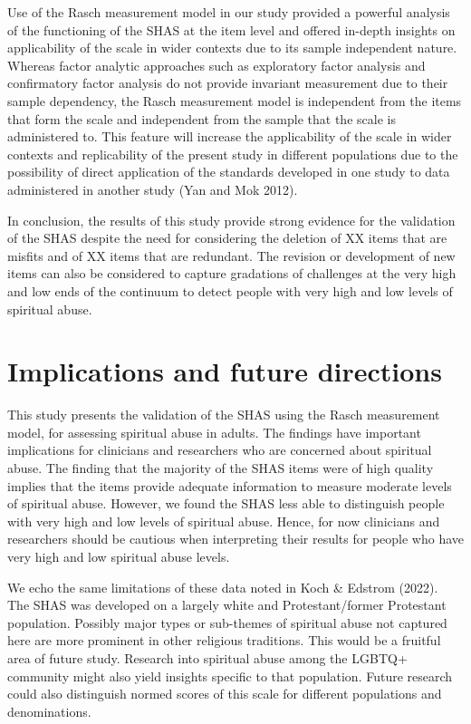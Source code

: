 \documentclass[
  letterpaper,
]{article}
\begin{document}
Use of the Rasch measurement model in our study provided a powerful
analysis of the functioning of the SHAS at the item level and offered
in-depth insights on applicability of the scale in wider contexts due to
its sample independent nature. Whereas factor analytic approaches such
as exploratory factor analysis and confirmatory factor analysis do not
provide invariant measurement due to their sample dependency, the Rasch
measurement model is independent from the items that form the scale and
independent from the sample that the scale is administered to. This
feature will increase the applicability of the scale in wider contexts
and replicability of the present study in different populations due to
the possibility of direct application of the standards developed in one
study to data administered in another study (Yan and Mok 2012).

In conclusion, the results of this study provide strong evidence for the
validation of the SHAS despite the need for considering the deletion of
XX items that are misfits and of XX items that are redundant. The
revision or development of new items can also be considered to capture
gradations of challenges at the very high and low ends of the continuum
to detect people with very high and low levels of spiritual abuse.

\section*{Implications and future
directions}\label{implications-and-future-directions}


This study presents the validation of the SHAS using the Rasch
measurement model, for assessing spiritual abuse in adults. The findings
have important implications for clinicians and researchers who are
concerned about spiritual abuse. The finding that the majority of the
SHAS items were of high quality implies that the items provide adequate
information to measure moderate levels of spiritual abuse. However, we
found the SHAS less able to distinguish people with very high and low
levels of spiritual abuse. Hence, for now clinicians and researchers
should be cautious when interpreting their results for people who have
very high and low spiritual abuse levels.

We echo the same limitations of these data noted in Koch \& Edstrom
(2022). The SHAS was developed on a largely white and Protestant/former
Protestant population. Possibly major types or sub-themes of spiritual
abuse not captured here are more prominent in other religious
traditions. This would be a fruitful area of future study. Research into
spiritual abuse among the LGBTQ+ community might also yield insights
specific to that population. Future research could also distinguish
normed scores of this scale for different populations and denominations.
\end{document}
